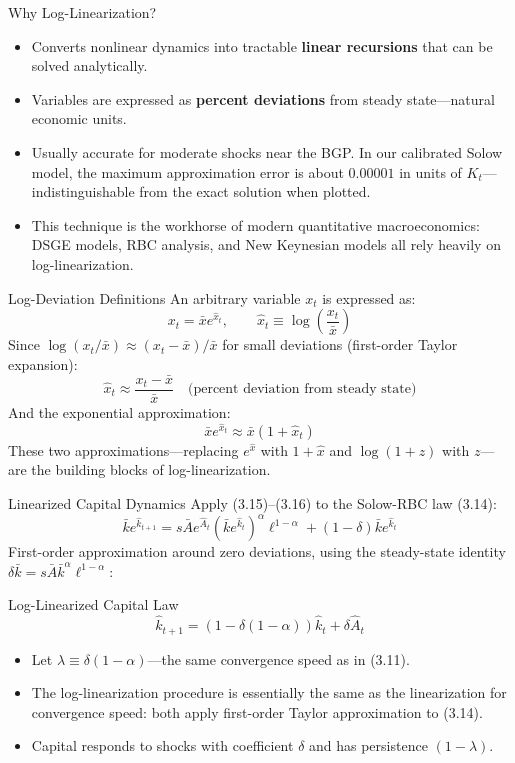 \documentclass[aspectratio=169,10pt]{beamer}
\newcommand{\apxbutton}[1]{\hfill\hyperlink{#1}{\beamerbutton{Appendix}}}
\begin{document}
\begin{frame}{Why Log-Linearization?}
\begin{itemize}
  \item Converts nonlinear dynamics into tractable \textbf{linear recursions} that can be solved analytically.
  \item Variables are expressed as \textbf{percent deviations} from steady state---natural economic units.
  \item Usually accurate for moderate shocks near the BGP. In our calibrated Solow model, the maximum approximation error is about $0.00001$ in units of $K_t$---indistinguishable from the exact solution when plotted.
  \item This technique is the workhorse of modern quantitative macroeconomics: DSGE models, RBC analysis, and New Keynesian models all rely heavily on log-linearization.
\end{itemize}
\end{frame}

\begin{frame}{Log-Deviation Definitions}
An arbitrary variable $x_t$ is expressed as:
\[
x_t=\bar{x}e^{\hat{x}_t},\qquad \hat{x}_t\equiv \log\left(\frac{x_t}{\bar{x}}\right) \tag{3.15}
\]
Since $\log(x_t/\bar{x}) \approx (x_t-\bar{x})/\bar{x}$ for small deviations (first-order Taylor expansion):
\[
\hat{x}_t\approx \frac{x_t-\bar{x}}{\bar{x}} \quad\text{(percent deviation from steady state)}
\]
And the exponential approximation:
\[
\bar{x}e^{\hat{x}_t}\approx \bar{x}(1+\hat{x}_t) \tag{3.16}
\]
These two approximations---replacing $e^{\hat{x}}$ with $1+\hat{x}$ and $\log(1+z)$ with $z$---are the building blocks of log-linearization.
\end{frame}

\begin{frame}{Linearized Capital Dynamics}
\hypertarget{m-a15}{}
Apply (3.15)--(3.16) to the Solow-RBC law (3.14):
\[
\bar{k}e^{\hat{k}_{t+1}}=s\bar{A}e^{\hat{A}_t}(\bar{k}e^{\hat{k}_t})^{\alpha}\ell^{1-\alpha}+(1-\delta)\bar{k}e^{\hat{k}_t}
\]
First-order approximation around zero deviations, using the steady-state identity $\delta\bar{k}=s\bar{A}\bar{k}^{\alpha}\ell^{1-\alpha}$:
\begin{block}{Log-Linearized Capital Law}
\[
\hat{k}_{t+1}=(1-\delta(1-\alpha))\hat{k}_t + \delta \hat{A}_t \tag{3.18}
\]
\end{block}
\begin{itemize}
  \item Let $\lambda\equiv \delta(1-\alpha)$---the same convergence speed as in (3.11).
  \item The log-linearization procedure is essentially the same as the linearization for convergence speed: both apply first-order Taylor approximation to (3.14).
  \item Capital responds to shocks with coefficient $\delta$ and has persistence $(1-\lambda)$.
\end{itemize}
\apxbutton{a15}
\end{frame}
\end{document}
